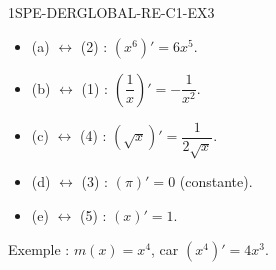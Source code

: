 
\begin{corrige}{1SPE-DERGLOBAL-RE-C1-EX3}

\begin{itemize}
  \item (a) $\leftrightarrow$ (2) : $(x^6)' = 6x^5$.
  \item (b) $\leftrightarrow$ (1) : $\left(\dfrac{1}{x}\right)' = -\dfrac{1}{x^2}$.
  \item (c) $\leftrightarrow$ (4) : $(\sqrt{x})' = \dfrac{1}{2\sqrt{x}}$.
  \item (d) $\leftrightarrow$ (3) : $(\pi)' = 0$ (constante).
  \item (e) $\leftrightarrow$ (5) : $(x)' = 1$.
\end{itemize}

\medskip


Exemple : $m(x) = x^4$, car $(x^4)' = 4x^3$.

\end{corrige}
